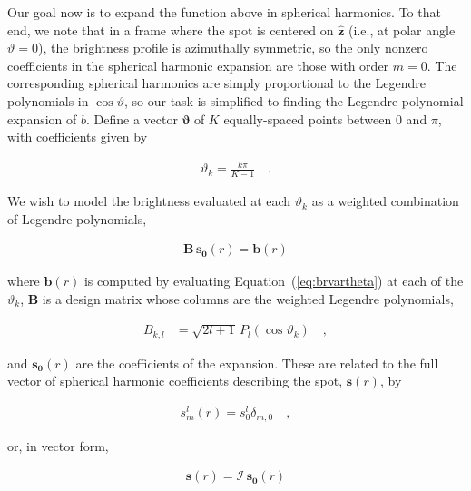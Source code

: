 \documentclass[modern,linenumbers]{aastex62}
\begin{document}
Our goal now is to expand the function above in spherical harmonics. To that end,
we note that in a frame where the spot is centered on $\hat{\mathbf{z}}$
(i.e., at polar angle $\vartheta = 0$), the brightness profile is azimuthally
symmetric, so the only nonzero coefficients in the spherical harmonic
expansion are those with order $m = 0$. The corresponding spherical harmonics are
simply proportional to the Legendre polynomials in $\cos\vartheta$, so our task is
simplified to finding the Legendre polynomial expansion of $b$.
Define a vector $\pmb{\vartheta}$ of $K$ equally-spaced points
between $0$ and $\pi$, with coefficients given by
%
\begin{linenomath}\begin{align}
        \vartheta_k = \frac{k\pi}{K-1}
        \quad.
    \end{align}\end{linenomath}
%
We wish to model the brightness evaluated at each $\vartheta_k$
as a weighted combination of Legendre polynomials,
%
\begin{linenomath}\begin{align}
        \mathbf{B} \, \mathbf{s_0}(r) = \mathbf{b}(r)
    \end{align}\end{linenomath}
%
%
where $\mathbf{b}(r)$ is computed by evaluating Equation~(\ref{eq:brvartheta})
at each of the $\vartheta_k$,
$\mathbf{B}$ is a design matrix whose columns are
the weighted Legendre polynomials,
%
\begin{linenomath}\begin{align}
        B_{k,l} & = \sqrt{2l + 1} \, P_l\left( \cos \vartheta_k \right)
        \quad,
    \end{align}\end{linenomath}
%
and $\mathbf{s_0}(r)$ are the coefficients of the expansion.
These are related to the full vector of spherical harmonic coefficients describing
the spot, $\mathbf{s}(r)$, by
%
\begin{linenomath}\begin{align}
        s^l_m(r) = s^l_0 \delta_{m,0}
        \quad,
    \end{align}\end{linenomath}
%
or, in vector form,
%
\begin{linenomath}\begin{align}
        \label{eq:sofr}
        \mathbf{s}(r) = \pmb{\mathcal{I}} \, \mathbf{s_0}(r)
    \end{align}\end{linenomath}
\end{document}
